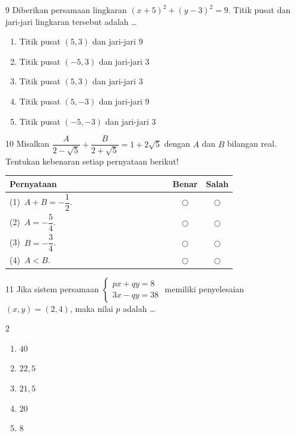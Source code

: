 \documentclass[11pt]{article}
\newenvironment{pil}{%
  \begin{enumerate}[label=(\Alph*),leftmargin=*,itemsep=1pt,topsep=3pt]}%
  {\end{enumerate}}
\newenvironment{pilB}{%
  \par\smallskip\begin{multicols}{2}
  \begin{enumerate}[label=(\Alph*),leftmargin=*,itemsep=1pt,topsep=3pt]}%
  {\end{enumerate}\end{multicols}}
\begin{document}
\begin{soal}{9}
Diberikan persamaan lingkaran $(x+5)^2+(y-3)^2=9$. Titik pusat dan
jari-jari lingkaran tersebut adalah \ldots
\begin{pil}
  \item Titik pusat $(5,3)$ dan jari-jari $9$
  \item Titik pusat $(-5,3)$ dan jari-jari $3$
  \item Titik pusat $(5,3)$ dan jari-jari $3$
  \item Titik pusat $(5,-3)$ dan jari-jari $9$
  \item Titik pusat $(-5,-3)$ dan jari-jari $3$
\end{pil}
\end{soal}

\begin{soal}{10}
Misalkan $\dfrac{A}{2-\sqrt{5}}+\dfrac{B}{2+\sqrt{5}}=1+2\sqrt{5}$
dengan $A$ dan $B$ bilangan real.
Tentukan kebenaran setiap pernyataan berikut!

\par\smallskip
{\renewcommand{\arraystretch}{1.4}%
\begin{tabular}{@{}p{0.76\linewidth}cc@{}}
\hline
\textbf{Pernyataan} & \textbf{Benar} & \textbf{Salah}\\
\hline
(1)~$A + B = -\dfrac{1}{2}$.
  & $\bigcirc$ & $\bigcirc$\\
(2)~$A = -\dfrac{5}{4}$.
  & $\bigcirc$ & $\bigcirc$\\
(3)~$B = -\dfrac{3}{4}$.
  & $\bigcirc$ & $\bigcirc$\\
(4)~$A < B$.
  & $\bigcirc$ & $\bigcirc$\\
\hline
\end{tabular}}
\end{soal}


\begin{soal}{11}
Jika sistem persamaan $\begin{cases}px+qy=8\\ 3x-qy=38\end{cases}$
memiliki penyelesaian $(x,y)=(2,4)$, maka nilai $p$ adalah \ldots
\begin{pilB}
  \item $40$ \item $22{,}5$ \item $21{,}5$ \item $20$ \item $8$
\end{pilB}
\end{soal}
\end{document}
